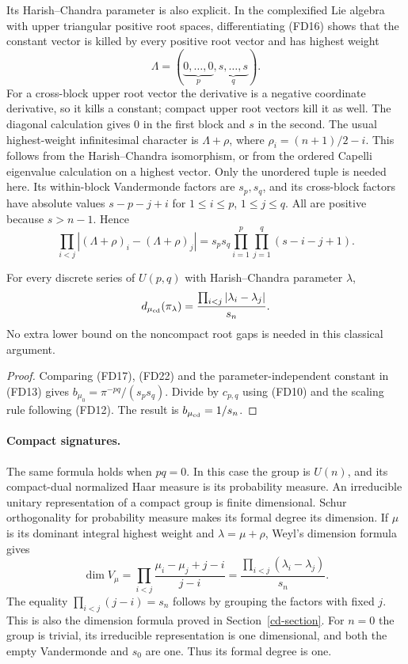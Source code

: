 Its Harish--Chandra parameter is also explicit. In the
complexified Lie algebra with upper triangular positive
root spaces, differentiating (FD16) shows that the
constant vector is killed by every positive root vector
and has highest weight
\[
                 \Lambda=(\underbrace{0,\ldots,0}_{p},
                            \underbrace{s,\ldots,s}_{q}).
 \tag{FD21}
\]
For a cross-block upper root vector the derivative is a
negative coordinate derivative, so it kills a constant;
compact upper root vectors kill it as well.
The diagonal calculation gives $0$ in the first block
and $s$ in the second. The usual highest-weight
infinitesimal character is $\Lambda+\rho$, where
$\rho_i=(n+1)/2-i$. This follows from the
Harish--Chandra isomorphism, or from the ordered Capelli
eigenvalue calculation on a highest vector.
Only the unordered tuple is needed here.
Its within-block Vandermonde factors are $s_p,s_q$, and
its cross-block factors have absolute values
$s-p-j+i$ for $1\le i\le p$, $1\le j\le q$.
All are positive because $s>n-1$. Hence
\[
 \prod_{i<j}|(\Lambda+\rho)_i-(\Lambda+\rho)_j|
       =s_ps_q\prod_{i=1}^p\prod_{j=1}^q(s-i-j+1).
 \tag{FD22}
\]

\begin{theorem}\label{fd-formula}
For every discrete series of $U(p,q)$ with
Harish--Chandra parameter $\lambda$,
\begin{equation}\label{fd-exact}
            d_{\mu_{\rm cd}}(\pi_\lambda)
                 =\frac{\prod_{i<j}|\lambda_i-\lambda_j|}{s_n}.
\end{equation}
No extra lower bound on the noncompact root gaps is needed
in this classical argument.
\end{theorem}
\begin{proof}
Comparing (FD17), (FD22) and the parameter-independent
constant in (FD13) gives
$b_{\mu_0}=\pi^{-pq}/(s_ps_q)$.
Divide by $c_{p,q}$ using (FD10) and the scaling
rule following (FD12). The result is $b_{\mu_{\rm cd}}=1/s_n$.
\end{proof}

\paragraph{Compact signatures.}
The same formula holds when $pq=0$. In this case the group
is $U(n)$, and its compact-dual normalized Haar measure is
its probability measure. An irreducible unitary representation
of a compact group is finite dimensional. Schur orthogonality
for probability measure makes its formal degree its dimension.
If $\mu$ is its dominant integral highest weight and
$\lambda=\mu+\rho$, Weyl's dimension formula gives
\[
 \dim V_\mu
   =\prod_{i<j}\frac{\mu_i-\mu_j+j-i}{j-i}
   =\frac{\prod_{i<j}(\lambda_i-\lambda_j)}{s_n}.
\]
The equality $\prod_{i<j}(j-i)=s_n$ follows by grouping
the factors with fixed $j$. This is also the dimension
formula proved in Section~\ref{cd-section}.
For $n=0$ the group is trivial, its irreducible representation
is one dimensional, and both the empty Vandermonde and
$s_0$ are one. Thus its formal degree is one.

